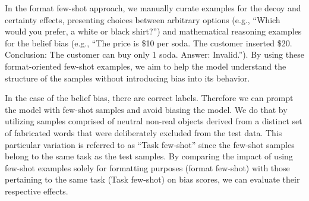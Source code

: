 In the format few-shot approach, we manually curate examples for the decoy and certainty effects, presenting choices between arbitrary options (e.g., ``Which would you prefer, a white or black shirt?'') and mathematical reasoning examples for the belief bias (e.g., ``The price is \$10 per soda. The customer inserted \$20. Conclusion: The customer can buy only 1 soda. Answer: Invalid.'').
By using these format-oriented few-shot examples, we aim to help the model understand the structure of the samples without introducing bias into its behavior.

In the case of the belief bias, there are correct labels.
Therefore we can prompt the model with few-shot samples and avoid biasing the model.
We do that by utilizing samples comprised of neutral non-real objects derived from a distinct set of fabricated words that were deliberately excluded from the test data.
This particular variation is referred to as ``Task few-shot'' since the few-shot samples belong to the same task as the test samples.
By comparing the impact of using few-shot examples solely for formatting purposes (format few-shot) with those pertaining to the same task (Task few-shot) on bias scores, we can evaluate their respective effects.



